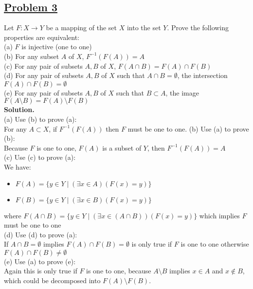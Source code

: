 \documentclass[10pt,letterpaper]{article}
\begin{document}
	\subsection*{{\color{purple}\underline{Problem 3}}}
	Let $F: X \rightarrow Y$ be a mapping of the set $X$ into the set $Y$. Prove the following properties are equivalent: \\
	(a) $F$ is injective (one to one) \\
	(b) For any subset $A$ of $X$, $F^{-1}(F(A)) = A$ \\
	(c) For any pair of subsets $A, B$ of $X$, $F(A \cap B) = F(A) \cap F(B)$ \\
	(d) For any pair of subsets $A, B$ of $X$ such that $A \cap B = \emptyset$, the intersection $F(A) \cap F(B) = \emptyset$ \\
	(e) For any pair of subsets $A, B$ of $X$ such that $B \subset A$, the image $F(A \setminus B) = F(A) \setminus F(B)$ \\
	
	\textbf{Solution.} \\
	(a) Use (b) to prove (a): \\
		For any $A \subset X$, if $F^{-1}(F(A))$ then $F$ must be one to one.
	(b) Use (a) to prove (b): \\ 
		Because $F$ is one to one, $F(A)$ is a subset of $Y$, then $F^{-1}(F(A)) = A$\\
	(c) Use (c) to prove (a): \\ 
	We have:
	\begin{itemize}
		\item $F(A) = \{ y \in Y \mid (\exists x \in A)(F(x) = y)\}$
		\item $F(B) = \{ y \in Y \mid (\exists x \in B)(F(x) = y)\}$
	\end{itemize}
 	where $F(A \cap B) = \{ y \in Y \mid (\exists x \in (A \cap B))(F(x) = y)\}$ which implies $F$ must be one to one \\
 	(d) Use (d) to prove (a): \\
 	If $A \cap B = \emptyset$ implies $F(A) \cap F(B) = \emptyset$ is only true if $F$ is one to one otherwise $F(A) \cap
 	F(B) \neq \emptyset$ \\
 	(e) Use (a) to prove (e): \\
 	Again this is only true if $F$ is one to one, because $A \setminus B$ implies $x \in A$ and $x \not\in B$, which could
 	be decomposed into $F(A) \setminus F(B)$. \\
 	
\end{document}
